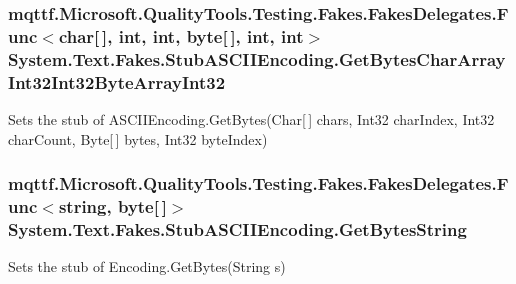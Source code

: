\hypertarget{class_system_1_1_text_1_1_fakes_1_1_stub_a_s_c_i_i_encoding_af44b112953b4e17d3139fd6a7ca643ae}{
\subsubsection[{Get\-Bytes\-Char\-Array\-Int32\-Int32\-Byte\-Array\-Int32}]{\setlength{\rightskip}{0pt plus 5cm}mqttf.\-Microsoft.\-Quality\-Tools.\-Testing.\-Fakes.\-Fakes\-Delegates.\-Func$<$char\mbox{[}$\,$\mbox{]}, int, int, byte\mbox{[}$\,$\mbox{]}, int, int$>$ System.\-Text.\-Fakes.\-Stub\-A\-S\-C\-I\-I\-Encoding.\-Get\-Bytes\-Char\-Array\-Int32\-Int32\-Byte\-Array\-Int32}}\label{class_system_1_1_text_1_1_fakes_1_1_stub_a_s_c_i_i_encoding_af44b112953b4e17d3139fd6a7ca643ae}


Sets the stub of A\-S\-C\-I\-I\-Encoding.\-Get\-Bytes(\-Char\mbox{[}$\,$\mbox{]} chars, Int32 char\-Index, Int32 char\-Count, Byte\mbox{[}$\,$\mbox{]} bytes, Int32 byte\-Index)

\hypertarget{class_system_1_1_text_1_1_fakes_1_1_stub_a_s_c_i_i_encoding_a13d2094a6ff0a74076c54e741b711c6b}{
\subsubsection[{Get\-Bytes\-String}]{\setlength{\rightskip}{0pt plus 5cm}mqttf.\-Microsoft.\-Quality\-Tools.\-Testing.\-Fakes.\-Fakes\-Delegates.\-Func$<$string, byte\mbox{[}$\,$\mbox{]}$>$ System.\-Text.\-Fakes.\-Stub\-A\-S\-C\-I\-I\-Encoding.\-Get\-Bytes\-String}}\label{class_system_1_1_text_1_1_fakes_1_1_stub_a_s_c_i_i_encoding_a13d2094a6ff0a74076c54e741b711c6b}


Sets the stub of Encoding.\-Get\-Bytes(\-String s)


